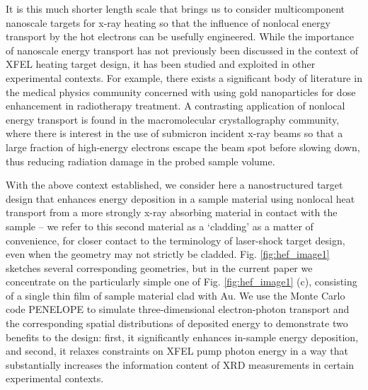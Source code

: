 It is this much shorter length scale that brings us to consider
multicomponent nanoscale targets for x-ray heating so that the influence
of nonlocal energy transport by the hot electrons can be usefully
engineered. While the importance of nanoscale energy transport has not
previously been discussed in the context of XFEL heating target design,
it has been studied and exploited in other experimental contexts. For
example, there exists a significant body of literature in the medical
physics community concerned with using gold nanoparticles for dose
enhancement in radiotherapy treatment. \cite{LEE2012GEOMETRY, LEUNG2011IRRADIATION} A contrasting
application of nonlocal energy transport is found in the macromolecular
crystallography community, where there is interest in the use of
submicron incident x-ray beams so that a large fraction of high-energy
electrons escape the beam spot before slowing down, thus reducing
radiation damage in the probed sample volume. \cite{STERN2009REDUCING, FINFROCK2013MITIGATION, FINFROCK2010SPATIAL, NAVE2005TOWARDS, SANISHVILI2011RADIATION}

With the above context established, we consider here a nanostructured
target design that enhances energy deposition in a sample material using
nonlocal heat transport from a more strongly x-ray absorbing material in
contact with the sample -- we refer to this second material as a
`cladding' as a matter of convenience, for closer contact to the
terminology of laser-shock target design, even when the geometry may not
strictly be cladded. Fig. \ref{fig:hef_image1} sketches several corresponding geometries,
but in the current paper we concentrate on the particularly simple one
of Fig. \ref{fig:hef_image1} (c), consisting of a single thin film of sample material clad
with Au. We use the Monte Carlo code PENELOPE to simulate
three-dimensional electron-photon transport and the corresponding
spatial distributions of deposited energy to demonstrate two benefits to
the design: first, it significantly enhances in-sample energy
deposition, and second, it relaxes constraints on XFEL pump photon
energy in a way that substantially increases the information content of
XRD measurements in certain experimental contexts.

